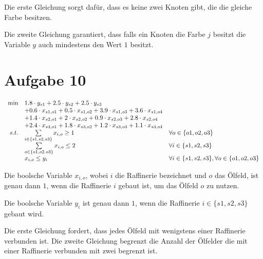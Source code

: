 \documentclass[10pt]{article}
\begin{document}
  Die erste Gleichung sorgt dafür, dass es keine zwei Knoten gibt, die die
  gleiche Farbe besitzen.

  Die zweite Gleichung garantiert, dass falls ein Knoten die Farbe $j$ besitzt
  die Variable $y$ auch mindestens den Wert $1$ besitzt.


\section*{Aufgabe 10}
  \begin{equation}
    \begin{array}{r l l}
      \min  & 1.8\cdot y_{s1} + 2.5\cdot y_{s2} + 2.5\cdot y_{s3} &\\
            & + 0.6\cdot x_{s1,o1} + 0.5\cdot x_{s1,o2} +3.9\cdot x_{s1,o3} 
                + 3.6\cdot x_{s1,o4} & \\
            & + 1.4\cdot x_{s2,o1} + 2\cdot x_{s2,o2} + 0.9\cdot x_{s2,o3}
                + 2.8\cdot x_{s2,o4} & \\
            & + 2.4\cdot x_{s3,o1} + 1.8\cdot x_{s3,o2} + 1.2 \cdot x_{s3,o3} 
              + 1.1 \cdot x_{s3,o4} & \\
      s.t. & \sum\limits_{i\in \{s1,s2,s3\}} x_{i,o} \geq 1 & \forall o \in 
              \{o1, o2, o3\} \\
           & \sum\limits_{o\in \{o1,o2.o3\}} x_{i,o} \leq 2 & \forall i\in
              \{s1,s2,s3\} \\
           & x_{i,o} \leq y_{i} & \forall i \in \{s1,s2,s3\}, \forall o\in 
              \{o1,o2,o3\}

    \end{array}
  \end{equation}

  Die boolsche Variable $x_{i,o}$, wobei $i$ die Raffinerie bezeichnet und $o$
  das Ölfeld, ist genau dann $1$, wenn die Raffinerie $i$ gebaut ist, um das
  Ölfeld $o$ zu nutzen.

  Die boolsche Variable $y_{i}$ ist genau dann $1$, wenn die Raffinerie $i \in
  \{s1,s2,s3\}$ gebaut wird.
  
  Die erste Gleichung fordert, dass jedes Ölfeld mit wenigstens einer Raffinerie
  verbunden ist.
  Die zweite Gleichung begrenzt die Anzahl der Ölfelder die mit einer Raffinerie
  verbunden mit zwei begrenzt ist.
\end{document}
